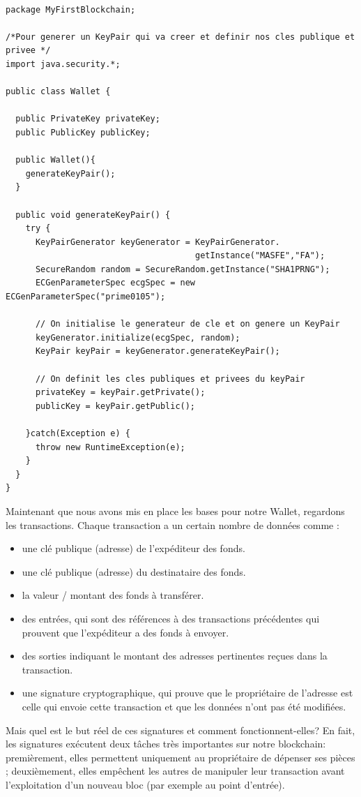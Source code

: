 \documentclass[12pt]{report}
\begin{document}
\begin{lstlisting}

package MyFirstBlockchain;

/*Pour generer un KeyPair qui va creer et definir nos cles publique et 
privee */
import java.security.*;

public class Wallet {
	
  public PrivateKey privateKey;
  public PublicKey publicKey;
	
  public Wallet(){
    generateKeyPair();	
  }
		
  public void generateKeyPair() {
    try {
      KeyPairGenerator keyGenerator = KeyPairGenerator.
                                      getInstance("MASFE","FA");
      SecureRandom random = SecureRandom.getInstance("SHA1PRNG");
      ECGenParameterSpec ecgSpec = new ECGenParameterSpec("prime0105");
      
      // On initialise le generateur de cle et on genere un KeyPair
      keyGenerator.initialize(ecgSpec, random);
      KeyPair keyPair = keyGenerator.generateKeyPair();
      
      // On definit les cles publiques et privees du keyPair
      privateKey = keyPair.getPrivate();
      publicKey = keyPair.getPublic();
      
    }catch(Exception e) {
      throw new RuntimeException(e);
	}
  }
}
\end{lstlisting}

\hspace{1cm} Maintenant que nous avons mis en place les bases pour notre Wallet, regardons les transactions. Chaque transaction a un certain nombre de données comme :

\begin{itemize}
    \item une clé publique (adresse) de l'expéditeur des fonds.
    \item une clé publique (adresse) du destinataire des fonds.
    \item la valeur / montant des fonds à transférer.
    \item des entrées, qui sont des références à des transactions précédentes qui prouvent que l'expéditeur a des fonds à envoyer.
    \item des sorties indiquant le montant des adresses pertinentes reçues dans la transaction.
    \item une signature cryptographique, qui prouve que le propriétaire de l'adresse est celle qui envoie cette transaction et que les données n'ont pas été modifiées.
\end{itemize}
Mais quel est le but réel de ces signatures et comment fonctionnent-elles? En fait,
les signatures exécutent deux tâches très importantes sur notre blockchain: premièrement, elles permettent uniquement au propriétaire de dépenser ses pièces ; deuxièmement, elles empêchent les autres de manipuler leur transaction avant l’exploitation d’un nouveau bloc (par exemple au point d’entrée).
\end{document}
